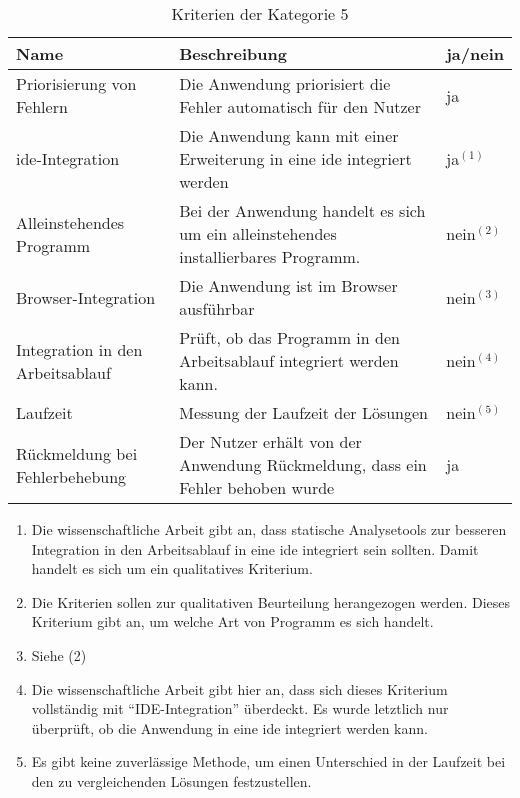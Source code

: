 \begin{table}[t]
    \centering
    \begin{tabularx}{\columnwidth}{XXl}
        \toprule
        \textbf{Name}                    & \textbf{Beschreibung}                                                              & \textbf{ja/nein} \\
        \midrule
        Priorisierung von Fehlern        & Die Anwendung priorisiert die Fehler automatisch für den Nutzer                    & ja               \\
        \midrule
        \ac{ide}-Integration             & Die Anwendung kann mit einer Erweiterung in eine \ac{ide} integriert werden        & ja$^{(1)}$       \\
        \midrule
        Alleinstehendes Programm         & Bei der Anwendung handelt es sich um ein alleinstehendes installierbares Programm. & nein$^{(2)}$     \\
        \midrule
        Browser-Integration              & Die Anwendung ist im Browser ausführbar                                            & nein$^{(3)}$     \\
        \midrule
        Integration in den Arbeitsablauf & Prüft, ob das Programm in den Arbeitsablauf integriert werden kann.                & nein$^{(4)}$     \\
        \midrule
        Laufzeit                         & Messung der Laufzeit der Lösungen                                                  & nein$^{(5)}$     \\
        \midrule
        Rückmeldung bei Fehlerbehebung   & Der Nutzer erhält von der Anwendung Rückmeldung, dass ein Fehler behoben wurde     & ja               \\
        \bottomrule
    \end{tabularx}
    \caption{Kriterien der Kategorie 5}
    \label{tbl:criteria-category-5}
\end{table}

\FloatBarrier

\begin{enumerate}[label= (\arabic*)]
    \item Die wissenschaftliche Arbeit gibt an, dass statische Analysetools zur besseren Integration in den Arbeitsablauf in eine \ac{ide} integriert sein sollten.
          Damit handelt es sich um ein qualitatives Kriterium.
    \item Die Kriterien sollen zur qualitativen Beurteilung herangezogen werden. Dieses Kriterium gibt an, um welche Art von Programm es sich handelt.
    \item Siehe (2)
    \item Die wissenschaftliche Arbeit gibt hier an, dass sich dieses Kriterium vollständig mit ``IDE-Integration'' überdeckt. Es wurde letztlich nur überprüft, ob die Anwendung in eine \ac{ide} integriert werden kann.
    \item Es gibt keine zuverlässige Methode, um einen Unterschied in der Laufzeit bei den zu vergleichenden Lösungen festzustellen.
\end{enumerate}

